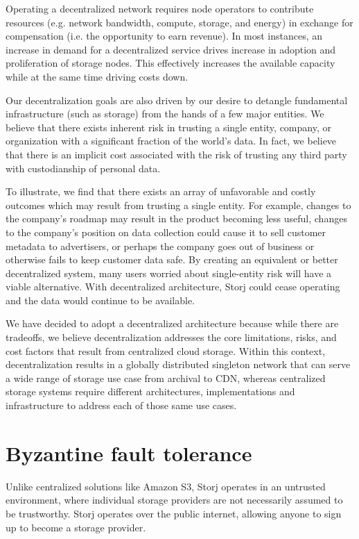 \documentclass[11pt,fleqn,openany]{book}
\begin{document}
Operating a decentralized network requires node operators to contribute
resources (e.g. network bandwidth, compute, storage, and energy) in exchange
for compensation (i.e. the opportunity to earn revenue).
In most instances, an increase in demand for a decentralized service drives
increase in adoption and proliferation of storage nodes.
This effectively increases the available capacity while at the same time
driving costs down.

Our decentralization goals are also driven by our desire to detangle
fundamental infrastructure (such as storage) from the hands of a few major
entities.
We believe that there exists inherent risk in trusting a single entity,
company, or organization with a significant fraction of the world's data.
In fact, we believe that there is an implicit cost associated with the risk of
trusting any third party with custodianship of personal data.

To illustrate, we find that there exists an array of unfavorable
and costly outcomes which may result from trusting a single entity.
For example, changes to the company's roadmap may result in the product
becoming less useful, changes to the company's position on data collection could
cause it to sell customer metadata to advertisers, or perhaps the company goes
out of business or otherwise fails to keep customer data safe.
By creating an equivalent or better decentralized
system, many users worried about single-entity risk will have a viable
alternative.
With decentralized architecture, Storj could cease operating and the data
would continue to be available.

We have decided to adopt a decentralized architecture because while there
are tradeoffs, we believe decentralization addresses the core limitations,
risks, and cost factors that result from centralized cloud storage.
Within this context,
decentralization results in a globally distributed singleton network that can
serve a wide range of storage use case from archival to CDN, whereas
centralized storage systems require different architectures, implementations
and infrastructure to address each of those same use cases.

\section{Byzantine fault tolerance}

Unlike centralized solutions like Amazon S3, Storj operates in an untrusted
environment, where individual storage providers are not necessarily assumed to be
trustworthy. Storj operates over the public internet, allowing anyone to sign
up to become a storage provider.
\end{document}

